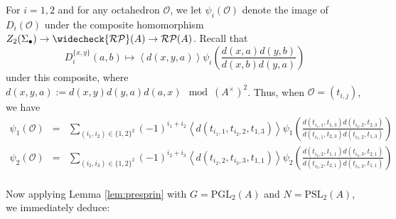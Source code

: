 \documentclass[12pt]{amsart}
\theoremstyle{definition}
\newcommand{\oct}{\mathcal{O}}%
\newcommand{\pspl}[2]{\mathrm{PSL}_{#1}(#2)}
\newcommand{\pgl}[2]{\mathrm{PGL}_{#1}(#2)}
\newcommand{\rpb}[1]{\mathcal{RP}(#1)}%
\newcommand{\crpb}[1]{\widecheck{\mathcal{RP}}(#1)}
\newcommand{\suss}[2]{\psi_{#1}\left( #2\right)}
\newcommand{\<}{\langle}
\renewcommand{\>}{\rangle}
\newcommand{\an}[1]{\left\langle{#1}\right\rangle}
\begin{document}
For $i=1,2$ and for any octahedron $\oct$, we let $\suss{i}{\oct}$ denote the image of $D_i(\oct)$ under the composite homomorphism $Z_2(\Sigma_\bullet)\to \crpb{A}\to\rpb{A}$.  Recall that 
\[
D_i^{\{ x,y\}}(a,b)\mapsto \an{d(x,y,a)}\suss{i}{\frac{d(x,a)d(y,b)}{d(x,b)d(y,a)}}
\]
under this composite, where $d(x,y,a):=d(x,y)d(y,a)d(a,x)\mod{(A^\times)^2}$. Thus, when $\oct =(t_{i,j})$, we have 
\begin{eqnarray*}
\suss{1}{\oct}&=&\sum_{(i_1,i_2)\in \{ 1,2\}^2}(-1)^{i_1+i_2}\an{d(t_{i_1,1},t_{i_2,2},t_{1,3})}\suss{1}{\frac{d(t_{i_1,1},t_{1,3})d(t_{i_2,2},t_{2,3})}{d(t_{i_1,1},t_{2,3})d(t_{i_2,2},t_{1,3})}}\\
\suss{2}{\oct}&=&\sum_{(i_2,i_3)\in \{ 1,2\}^2}(-1)^{i_2+i_3}\an{d(t_{i_2,2},t_{i_3,3},t_{1,1})}\suss{2}{\frac{d(t_{i_2,2},t_{1,1})d(t_{i_3,3},t_{2,1})}{d(t_{i_2,2},t_{2,1})d(t_{i_3,3},t_{1,1})}}\\
\end{eqnarray*}

Now applying Lemma \ref{lem:presprin} with $G=\pgl{2}{A}$ and $N=\pspl{2}{A}$, we immediately deduce:
\end{document}
